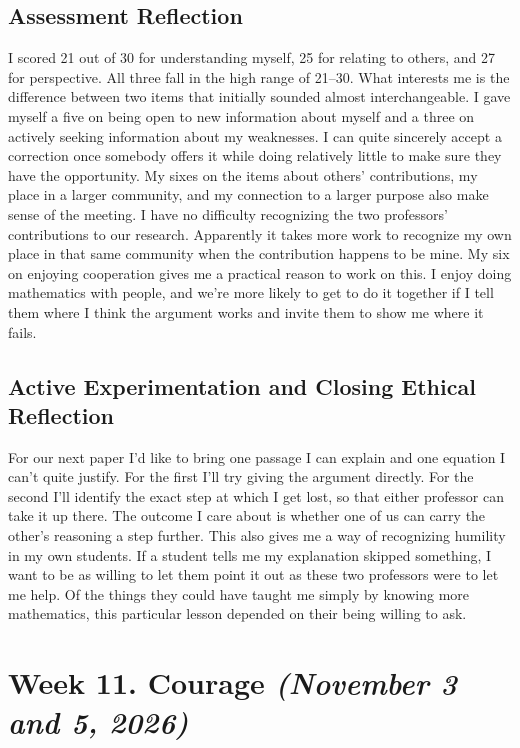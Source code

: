 \documentclass[12pt,letterpaper]{article}
\newcommand{\entry}[1]{\clearpage\section{#1}}
\begin{document}
\subsection{Assessment Reflection}
I scored 21 out of 30 for understanding myself, 25 for relating to others, and 27 for perspective. All three fall in the high range of 21--30. What interests me is the difference between two items that initially sounded almost interchangeable. I gave myself a five on being open to new information about myself and a three on actively seeking information about my weaknesses. I can quite sincerely accept a correction once somebody offers it while doing relatively little to make sure they have the opportunity. My sixes on the items about others' contributions, my place in a larger community, and my connection to a larger purpose also make sense of the meeting. I have no difficulty recognizing the two professors' contributions to our research. Apparently it takes more work to recognize my own place in that same community when the contribution happens to be mine. My six on enjoying cooperation gives me a practical reason to work on this. I enjoy doing mathematics with people, and we're more likely to get to do it together if I tell them where I think the argument works and invite them to show me where it fails.

\subsection{Active Experimentation and Closing Ethical Reflection}
For our next paper I'd like to bring one passage I can explain and one equation I can't quite justify. For the first I'll try giving the argument directly. For the second I'll identify the exact step at which I get lost, so that either professor can take it up there. The outcome I care about is whether one of us can carry the other's reasoning a step further. This also gives me a way of recognizing humility in my own students. If a student tells me my explanation skipped something, I want to be as willing to let them point it out as these two professors were to let me help. Of the things they could have taught me simply by knowing more mathematics, this particular lesson depended on their being willing to ask.

\entry{Week 11. Courage \textit{(November 3 and 5, 2026)}}
\end{document}
